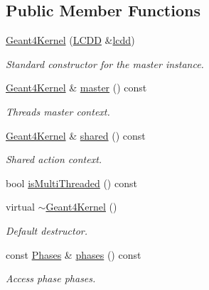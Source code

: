 \subsection*{Public Member Functions}
\begin{DoxyCompactItemize}
\item 
\hyperlink{class_d_d4hep_1_1_simulation_1_1_geant4_kernel_afa28c3122a6607f3641d22f1c1602786}{Geant4\+Kernel} (\hyperlink{class_d_d4hep_1_1_simulation_1_1_geant4_kernel_a190e652b62ebce3db3372c4265ffa5a3}{L\+C\+DD} \&\hyperlink{class_d_d4hep_1_1_simulation_1_1_geant4_kernel_ad58adb3734f2701198b8915a80cf4cdc}{lcdd})
\begin{DoxyCompactList}\small\item\em Standard constructor for the master instance. \end{DoxyCompactList}\item 
\hyperlink{class_d_d4hep_1_1_simulation_1_1_geant4_kernel}{Geant4\+Kernel} \& \hyperlink{class_d_d4hep_1_1_simulation_1_1_geant4_kernel_ad717838179751e34f857c1108ae6607b}{master} () const
\begin{DoxyCompactList}\small\item\em Thread\textquotesingle{}s master context. \end{DoxyCompactList}\item 
\hyperlink{class_d_d4hep_1_1_simulation_1_1_geant4_kernel}{Geant4\+Kernel} \& \hyperlink{class_d_d4hep_1_1_simulation_1_1_geant4_kernel_a70f423a6ae5211c76f90e8fb7561bdcf}{shared} () const
\begin{DoxyCompactList}\small\item\em Shared action context. \end{DoxyCompactList}\item 
bool \hyperlink{class_d_d4hep_1_1_simulation_1_1_geant4_kernel_a7bd105526c0873bd9b24d3de41052d88}{is\+Multi\+Threaded} () const
\item 
virtual \hyperlink{class_d_d4hep_1_1_simulation_1_1_geant4_kernel_a57dadf34909a60f7771fa15d4b7501d4}{$\sim$\+Geant4\+Kernel} ()
\begin{DoxyCompactList}\small\item\em Default destructor. \end{DoxyCompactList}\item 
const \hyperlink{class_d_d4hep_1_1_simulation_1_1_geant4_kernel_ae28985781d4226ece4c3fffe8827b400}{Phases} \& \hyperlink{class_d_d4hep_1_1_simulation_1_1_geant4_kernel_a94a98c5bbbd6cca43e9aecfaa135ef65}{phases} () const
\begin{DoxyCompactList}\small\item\em Access phase phases. \end{DoxyCompactList}\item 

\end{DoxyCompactItemize}

